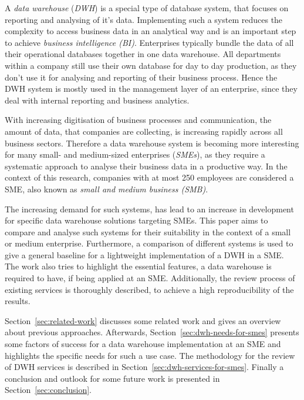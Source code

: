 \documentclass[../paper.tex]{subfiles}
\begin{document}
A \textit{data warehouse} (\textit{DWH}) is a special type of database system, that focuses on reporting and analysing of it's data. Implementing such a system reduces the complexity to access business data in an analytical way and is an important step to achieve \textit{business intelligence (BI)}. Enterprises typically bundle the data of all their operational databases together in one data warehouse. All departments within a company still use their own database for day to day production, as they don't use it for analysing and reporting of their business process. Hence the DWH system is mostly used in the management layer of an enterprise, since they deal with internal reporting and business analytics.

With increasing digitisation of business processes and communication, the amount of data, that companies are collecting, is increasing rapidly across all business sectors. Therefore a data warehouse system is becoming more interesting for many small- and medium-sized enterprises (\textit{SMEs}), as they require a systematic approach to analyse their business data in a productive way. In the context of this research, companies with at most 250 employees are considered a SME, also known as \textit{small and medium business (SMB)}.

The increasing demand for such systems, has lead to an increase in development for specific data warehouse solutions targeting SMEs. This paper aims to compare and analyse such systems for their suitability in the context of a small or medium enterprise. Furthermore, a comparison of different systems is used to give a general baseline for a lightweight implementation of a DWH in a SME. The work also tries to highlight the essential features, a data warehouse is required to have, if being applied at an SME. Additionally, the review process of existing services is thoroughly described, to achieve a high reproducibility of the results.

Section~\ref{sec:related-work} discusses some related work and gives an overview about previous approaches. Afterwards, Section~\ref{sec:dwh-needs-for-smes} presents some factors of success for a data warehouse implementation at an SME and highlights the specific needs for such a use case. The methodology for the review of DWH services is described in Section~\ref{sec:dwh-services-for-smes}. Finally a conclusion and outlook for some future work is presented in Section~\ref{sec:conclusion}.
\end{document}
